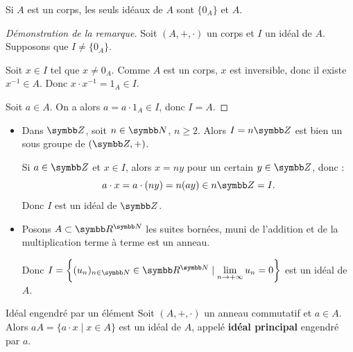 \begin{remarque}
    Si $A$ est un corps, les seuls idéaux de $A$ sont $\{0_A\}$ et $A$.
\end{remarque}

\begin{proof}[Démonstration de la remarque]

    Soit $(A, +, \cdot)$ un corps et $I$ un idéal de $A$. Supposons que $I \neq \{0_A\}$.

    Soit $x \in I$ tel que $x \neq 0_A$. Comme $A$ est un corps, $x$ est inversible, donc
    il existe $x^{-1} \in A$. Donc $x \cdot x^{-1} = 1_A \in I$.

    Soit $a \in A$. On a alors $a = a \cdot 1_A \in I$, donc $I = A$.
\end{proof}

\begin{exemple}
    \begin{itemize}
        \item Dans $\Z$, soit $n \in \N$, $n \geqslant 2$. Alors $I = n\Z$ est bien un sous groupe de $(\Z, +)$.

        Si $a \in \Z$ et $x \in I$, alors $x = ny$ pour un certain $y \in \Z$, donc :
        \[a \cdot x = a \cdot (ny) = n(ay) \in n\Z = I.\]
        Donc $I$ est un idéal de $\Z$.

        \item Posons $A \subset \R^{\N}$ les suites bornées, muni de l'addition et de la multiplication terme à terme
        est un anneau.

        Donc $I = \left\{(u_n)_{n \in \N} \in \R^{\N} \mid \lim\limits_{n \to +\infty} u_n = 0\right\}$ est un idéal de $A$.
    \end{itemize}
\end{exemple}

\begin{theoreme}{Idéal engendré par un élément}{}
    Soit $(A, +, \cdot)$ un anneau commutatif et $a \in A$. Alors
    $aA = \{a \cdot x \mid x \in A\}$ est un idéal de $A$, appelé
    \textbf{idéal principal} engendré par $a$.
\end{theoreme}

